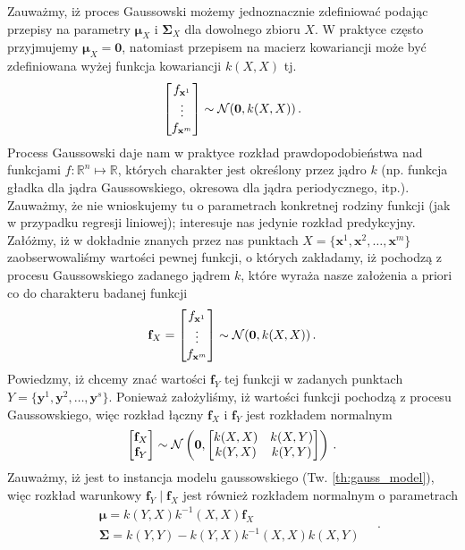 \documentclass{myclass}
\numberwithin{equation}{section}
\begin{document}
Zauważmy, iż proces Gaussowski możemy jednoznacznie zdefiniować podając przepisy na parametry
\(\boldsymbol{\mu}_X\) i \(\mathbf{\Sigma}_X\) dla dowolnego zbioru \(X\). W praktyce często
przyjmujemy \(\boldsymbol{\mu}_X = \mathbf{0}\), natomiast przepisem na macierz kowariancji może być
zdefiniowana wyżej funkcja kowariancji \(k(X,X)\) tj.
\begin{equation}
    \mqty[f_{\mathbf{x}^1} \\ \vdots \\ f_{\mathbf{x}^m}] \sim \mathcal{N}(\mathbf{0}, k(X,X))\,.
\end{equation}
Process Gaussowski daje nam w praktyce rozkład prawdopodobieństwa nad funkcjami
\(f:\mathbb{R}^n\mapsto\mathbb{R}\), których charakter jest określony przez jądro \(k\) (np. funkcja
gładka dla jądra Gaussowskiego, okresowa dla jądra periodycznego, itp.). Zauważmy, że nie
wnioskujemy tu o parametrach konkretnej rodziny funkcji (jak w przypadku regresji liniowej);
interesuje nas jedynie rozkład predykcyjny. Załóżmy, iż w dokładnie znanych przez nas punktach \(X =
\{\mathbf{x}^1,\mathbf{x}^2,\ldots,\mathbf{x}^m\}\) zaobserwowaliśmy wartości pewnej funkcji, o
których zakładamy, iż pochodzą z procesu Gaussowskiego zadanego jądrem \(k\), które wyraża nasze
założenia a priori co do charakteru badanej funkcji
\begin{equation}
    \mathbf{f}_X = \mqty[f_{\mathbf{x}^1} \\ \vdots \\ f_{\mathbf{x}^m}] \sim \mathcal{N}(\mathbf{0}, k(X,X))\,.
\end{equation}
Powiedzmy, iż chcemy znać wartości \(\mathbf{f}_Y\) tej funkcji w zadanych punktach \(Y =
\{\mathbf{y}^1,\mathbf{y}^2,\ldots,\mathbf{y}^s\}\). Ponieważ założyliśmy, iż wartości funkcji
pochodzą z procesu Gaussowskiego, więc rozkład łączny \(\mathbf{f}_X\) i \(\mathbf{f}_Y\) jest
rozkładem normalnym
\begin{equation}
    \mqty[\mathbf{f}_X \\ \mathbf{f}_Y] \sim \mathcal{N}\left(\mathbf{0}, \mqty[k(X,X) & k(X,Y) \\ k(Y,X) & k(Y,Y)]\right)\,.
\end{equation}
Zauważmy, iż jest to instancja modelu gaussowskiego (Tw. \ref{th:gauss_model}), więc rozkład
warunkowy \(\mathbf{f}_Y\mid \mathbf{f}_X\) jest również rozkładem normalnym o parametrach
\begin{equation}
    \begin{split}
        &\boldsymbol{\mu} = k(Y,X)k^{-1}(X,X)\mathbf{f}_X\\
        &\mathbf{\Sigma} = k(Y,Y) - k(Y,X)k^{-1}(X,X)k(X,Y)
    \end{split}\quad.
\end{equation}
\end{document}
